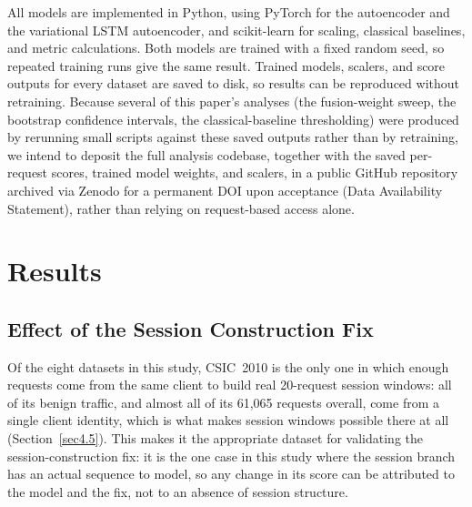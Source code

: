 \documentclass[futureinternet,article,submit,moreauthors]{Definitions/mdpi}
\begin{document}
All models are implemented in Python, using PyTorch for the autoencoder and the variational LSTM autoencoder, and scikit-learn for scaling, classical baselines, and metric calculations. Both models are trained with a fixed random seed, so repeated training runs give the same result. Trained models, scalers, and score outputs for every dataset are saved to disk, so results can be reproduced without retraining. Because several of this paper's analyses (the fusion-weight sweep, the bootstrap confidence intervals, the classical-baseline thresholding) were produced by rerunning small scripts against these saved outputs rather than by retraining, we intend to deposit the full analysis codebase, together with the saved per-request scores, trained model weights, and scalers, in a public GitHub repository archived via Zenodo for a permanent DOI upon acceptance (Data Availability Statement), rather than relying on request-based access alone.

\section{Results} \label{sec5}

\subsection{Effect of the Session Construction Fix} \label{sec5.1}

Of the eight datasets in this study, CSIC~2010 is the only one in which enough requests come from the same client to build real 20-request session windows: all of its benign traffic, and almost all of its 61{,}065 requests overall, come from a single client identity, which is what makes session windows possible there at all (Section~\ref{sec4.5}). This makes it the appropriate dataset for validating the session-construction fix: it is the one case in this study where the session branch has an actual sequence to model, so any change in its score can be attributed to the model and the fix, not to an absence of session structure.
\end{document}
